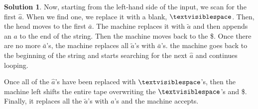\documentclass{article}
\theoremstyle{definition}
\newtheorem*{solution*}{Solution}
\begin{document}
\begin{enumerate}
\begin{solution*}
		Now, starting from the left-hand side of the input, we scan for the first $\hat{a}$. When we find one, we replace it with a blank, $\textvisiblespace$. Then, the head moves to the first $\bar{a}$. The machine replaces it with $\tilde{a}$ and then appends an $a$ to the end of the string. Then the machine moves back to the \$. Once there are no more $\bar{a}$'s, the machine replaces all $\tilde{a}$'s with $\bar{a}$'s. the machine goes back to the beginning of the string and starts searching for the next $\hat{a}$ and continues looping. 
		
		Once all of the $\hat{a}$'s have been replaced with $\textvisiblespace$'s, then the machine left shifts the entire tape overwriting the $\textvisiblespace$'s and \$. Finally, it replaces all the $\tilde{a}$'s with $a$'s and the machine accepts.  
		

\end{solution*}
\end{enumerate}
\end{document}
